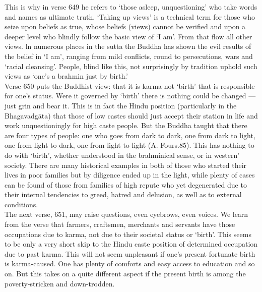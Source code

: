 This is why in verse 649 he refers to `those asleep, unquestioning' who take words and names as ultimate truth. `Taking up views' is a technical term for those who seize upon beliefs as true, whose beliefs (views) cannot be verified and upon a deeper level who blindly follow the basic view of `I am'. From that flow all other views. ln numerous places in the sutta the Buddha has shown the evil results of the belief in `I am', ranging from mild conflicts, round to persecutions, wars and `racial cleansing'. People, blind like this, not surprisingly by tradition uphold such views as `one's a brahmin just by birth.'\\

Verse 650 puts the Buddhist view: that it is karma not `birth' that is responsible for one's status. Were it governed by `birth' there is nothing could be changed — just grin and bear it. This is in fact the Hindu position (particularly in the Bhagavadg\=ata) that those of low castes should just accept their station in life and work unquestioningly for high caste people. But the Buddha taught that there are four types of people: one who goes from dark to dark, one from dark to light, one from light to dark, one from light to light (A. Fours.85). This has nothing to do with `birth', whether understood in the brahminical sense, or in western' society. There are many historical examples in both of those who started their lives in poor families but by diligence ended up in the light, while plenty of cases can be found of those from families of high repute who yet degenerated due to their internal tendencies to greed, hatred and delusion, as well as to external conditions.\\

The next verse, 651, may raise questions, even eyebrows, even voices. We learn from the verse that farmers, craftsmen, merchants and servants have those occupations due to karma, not due to their societal status or `birth'. This seems to be only a very short skip to the Hindu caste position of determined occupation due to past karma. This will not seem unpleasant if one's present fortunate birth is karma-caused. One has plenty of comforts and easy access to education and so on. But this takes on a quite different aspect if the present birth is among the poverty-stricken and down-trodden.\\

